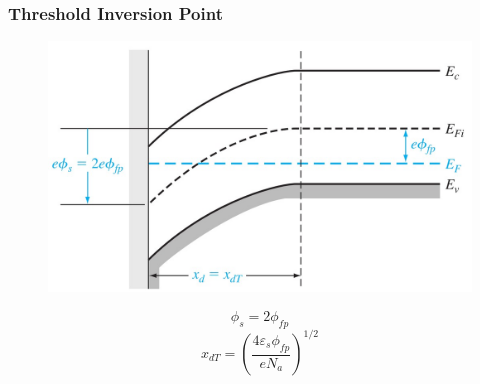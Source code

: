 \documentclass{beamer}
\begin{document}
    \begin{frame} \frametitle{Threshold Inversion Point}
        \begin{figure}[H]
            \centering
            \includegraphics[width=0.6\linewidth]{Threshold-inversion-point.jpg}
            \label{fig:Threshold-inversion-point.jpg}
        \end{figure}
        \begin{equation*}
            \phi_s = 2 \phi_{fp} 
        \end{equation*}
        \begin{equation*}
            \boxed{x_{dT} = \left( \frac{4\varepsilon_s \phi_{fp} }{e N_a} \right)^{1/2}  }
        \end{equation*}
    \end{frame}
\end{document}
